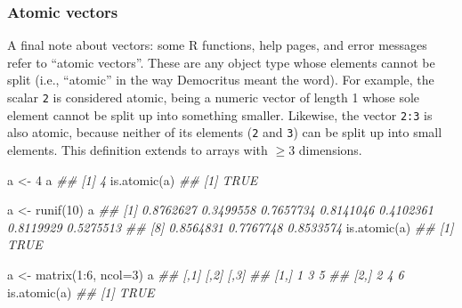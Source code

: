 \documentclass[
  13,
  letterpaper,
]{report}
\newenvironment{Shaded}{\begin{snugshade}}{\end{snugshade}}
\newcommand{\AttributeTok}[1]{\textcolor[rgb]{0.40,0.45,0.13}{#1}}
\newcommand{\DecValTok}[1]{\textcolor[rgb]{0.68,0.00,0.00}{#1}}
\newcommand{\DocumentationTok}[1]{\textcolor[rgb]{0.37,0.37,0.37}{\textit{#1}}}
\newcommand{\FunctionTok}[1]{\textcolor[rgb]{0.28,0.35,0.67}{#1}}
\newcommand{\NormalTok}[1]{\textcolor[rgb]{0.00,0.23,0.31}{#1}}
\newcommand{\OtherTok}[1]{\textcolor[rgb]{0.00,0.23,0.31}{#1}}
\newcommand{\SpecialCharTok}[1]{\textcolor[rgb]{0.37,0.37,0.37}{#1}}
\begin{document}
\subsubsection{Atomic vectors}\label{sec-03-struct-vect-atom}

A final note about vectors: some R functions, help pages, and error
messages refer to ``atomic vectors''. These are any object type whose
elements cannot be split (i.e., ``atomic'' in the way Democritus meant
the word). For example, the scalar \texttt{2} is considered atomic,
being a numeric vector of length 1 whose sole element cannot be split up
into something smaller. Likewise, the vector \texttt{2:3} is also
atomic, because neither of its elements (\texttt{2} and \texttt{3}) can
be split up into small elements. This definition extends to arrays with
\(\geq3\) dimensions.

\begin{Shaded}
\begin{Highlighting}[]
\NormalTok{a }\OtherTok{\textless{}{-}} \DecValTok{4}
\NormalTok{a}
\DocumentationTok{\#\# [1] 4}
\FunctionTok{is.atomic}\NormalTok{(a)}
\DocumentationTok{\#\# [1] TRUE}
\end{Highlighting}
\end{Shaded}

\begin{Shaded}
\begin{Highlighting}[]
\NormalTok{a }\OtherTok{\textless{}{-}} \FunctionTok{runif}\NormalTok{(}\DecValTok{10}\NormalTok{)}
\NormalTok{a}
\DocumentationTok{\#\#  [1] 0.8762627 0.3499558 0.7657734 0.8141046 0.4102361 0.8119929 0.5275513}
\DocumentationTok{\#\#  [8] 0.8564831 0.7767748 0.8533574}
\FunctionTok{is.atomic}\NormalTok{(a)}
\DocumentationTok{\#\# [1] TRUE}
\end{Highlighting}
\end{Shaded}

\begin{Shaded}
\begin{Highlighting}[]
\NormalTok{a }\OtherTok{\textless{}{-}} \FunctionTok{matrix}\NormalTok{(}\DecValTok{1}\SpecialCharTok{:}\DecValTok{6}\NormalTok{, }\AttributeTok{ncol=}\DecValTok{3}\NormalTok{)}
\NormalTok{a}
\DocumentationTok{\#\#      [,1] [,2] [,3]}
\DocumentationTok{\#\# [1,]    1    3    5}
\DocumentationTok{\#\# [2,]    2    4    6}
\FunctionTok{is.atomic}\NormalTok{(a)}
\DocumentationTok{\#\# [1] TRUE}
\end{Highlighting}
\end{Shaded}
\end{document}
